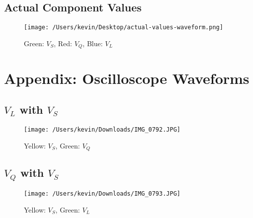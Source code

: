 \documentclass[12pt,a4paper,titlepage]{article}
\begin{document}
\subsection{Actual Component Values}
\begin{figure}[ht!]
\centering
\texttt{[image: /Users/kevin/Desktop/actual-values-waveform.png]}
\caption{Green: $V_S$, Red: $V_Q$, Blue: $V_L$ \label{overflow}}
\end{figure}

\section{Appendix: Oscilloscope Waveforms}

\subsection{$V_L$ with $V_S$}
\begin{figure}[ht!]
\centering
\texttt{[image: /Users/kevin/Downloads/IMG\_0792.JPG]}
\caption{Yellow: $V_S$, Green: $V_Q$ \label{overflow}}
\end{figure}


\subsection{$V_Q$ with $V_S$}
\begin{figure}[ht!]
\centering
\texttt{[image: /Users/kevin/Downloads/IMG\_0793.JPG]}
\caption{Yellow: $V_S$, Green: $V_L$ \label{overflow}}
\end{figure}
\end{document}
